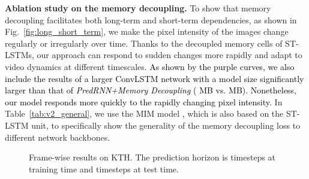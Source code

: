 \documentclass[10pt,journal,compsoc]{IEEEtran}
\newcommand{\tab}[1]{Table~\ref{#1}}
\newcommand{\fig}[1]{Fig.~\ref{#1}}
\newcommand{\revise}[1]{{\textcolor{black}{#1}}}
\newcommand{\myparagraph}[1]{\vspace{5pt} \noindent \textbf{#1.}}
\begin{document}
\myparagraph{Ablation study on the memory decoupling}
To show that memory decoupling facilitates both long-term and short-term dependencies, as shown in \fig{fig:long_short_term}, we make the pixel intensity of the images change regularly or irregularly over time. 
Thanks to the decoupled memory cells of ST-LSTMs, our approach can respond to sudden changes more rapidly and adapt to video dynamics at different timescales. 
\revise{
As shown by the purple curves, we also include the results of a larger ConvLSTM network with a model size significantly larger than that of \textit{PredRNN+Memory Decoupling} ( MB vs.  MB). Nonetheless, our model responds more quickly to the rapidly changing pixel intensity.}
In \tab{tab:v2_general}, we use the MIM model \cite{wang2019memory}, which is also based on the ST-LSTM unit, to specifically show the generality of the memory decoupling loss to different network backbones.



\begin{figure*}[t]
  \centering
\vskip -0.15in
\caption{Frame-wise results on KTH. The prediction horizon is  timesteps at training time and  timesteps at test time.}
\label{fig:kth_frame}
\vspace{-15pt}
\end{figure*}
\end{document}
